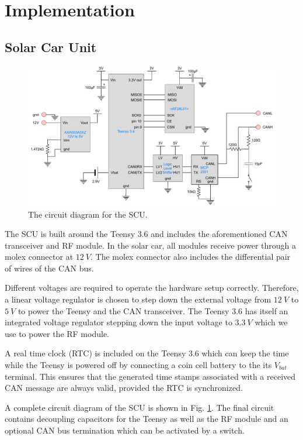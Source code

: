 \documentclass[a4paper,conference]{IEEEtran}
\begin{document}
\section{Implementation}
\subsection{Solar Car Unit}

\begin{figure}
    \centering
    \includegraphics[width=\linewidth]{documentation/images/SCU_CircuitDiagram.pdf}
    \caption{The circuit diagram for the SCU.}
    \label{fig:SCU_circuit}
\end{figure}

The SCU is built around the Teensy 3.6 and includes the aforementioned CAN transceiver and RF module. In the solar car, all modules receive power through a molex connector at $\SI{12}{V}$. The molex connector also includes the differential pair of wires of the CAN bus. 

Different voltages are required to operate the hardware setup correctly. Therefore, a linear voltage regulator is chosen to step down the external voltage from $\SI{12}{V}$ to $\SI{5}{V}$ to power the Teensy and the CAN transceiver. The Teensy 3.6 has itself an integrated voltage regulator stepping down the input voltage to $\SI{3.3}{V}$ which we use to power the RF module.

A real time clock (RTC) is included on the Teensy 3.6 which can keep the time while the Teensy is powered off by connecting a coin cell battery to the its $V_{bat}$ terminal. This ensures that the generated time stamps associated with a received CAN message are always valid, provided the RTC is synchronized. 

A complete circuit diagram of the SCU is shown in Fig. \ref{fig:SCU_circuit}. The final circuit contains decoupling capacitors for the Teensy as well as the RF module and an optional CAN bus termination which can be activated by a switch.
\end{document}
